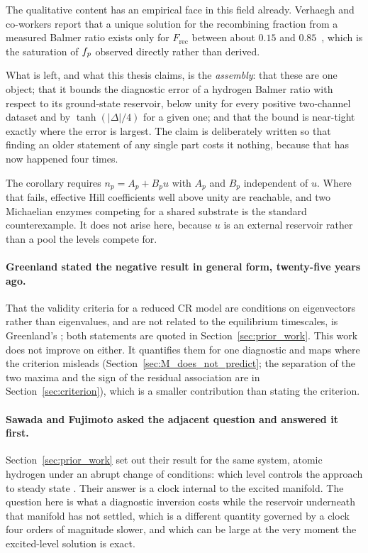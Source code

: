 The qualitative content has an empirical face in this field already. Verhaegh
and co-workers report that a unique solution for the recombining fraction from a
measured Balmer ratio exists only for $F_{\mathrm{rec}}$ between about $0.15$
and $0.85$~\cite{Verhaegh2019}, which is the saturation of $f_{p}$ observed
directly rather than derived.

What is left, and what this thesis claims, is the \emph{assembly}: that these
are one object; that it bounds the diagnostic error of a hydrogen Balmer ratio
with respect to its ground-state reservoir, below unity for every positive
two-channel dataset and by $\tanh(|\Delta|/4)$ for a given one; and that the
bound is near-tight exactly where the error is largest. The claim
is deliberately written so that finding an older statement of any single part
costs it nothing, because that has now happened four times.

The corollary requires $n_p = A_p + B_p u$ with $A_p$ and $B_p$ independent of
$u$. Where that fails, effective Hill coefficients well above unity are
reachable, and two Michaelian enzymes competing for a shared substrate is the
standard counterexample. It does not arise here, because $u$ is an external
reservoir rather than a pool the levels compete for.

\paragraph{Greenland stated the negative result in general form, twenty-five
years ago.} That the validity criteria for a reduced CR model are conditions on
eigenvectors rather than eigenvalues, and are not related to the equilibrium
timescales, is Greenland's \cite{Greenland2001a, Greenland2001b}; both
statements are quoted in Section~\ref{sec:prior_work}. This work does not
improve on either. It quantifies them for one diagnostic and maps where the
criterion misleads (Section~\ref{sec:M_does_not_predict}; the separation of the
two maxima and the sign of the residual association are in
Section~\ref{sec:criterion}), which is a smaller contribution than stating the
criterion.

\paragraph{Sawada and Fujimoto asked the adjacent question and answered it
first.} Section~\ref{sec:prior_work} set out their result for the same system,
atomic hydrogen under an abrupt change of conditions: which level controls the
approach to steady state \cite{SawadaFujimoto1994}. Their answer is a clock
internal to the excited manifold. The question here is
what a diagnostic inversion costs while the reservoir underneath that manifold
has not settled, which is a different quantity governed by a clock four orders
of magnitude slower, and which can be large at the very moment the excited-level
solution is exact.

